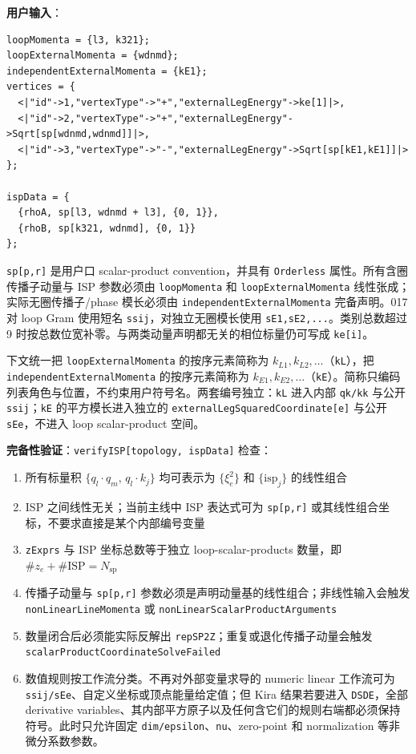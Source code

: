 ﻿\documentclass[a4paper,11pt]{article}
\begin{document}
\textbf{用户输入}：
\begin{verbatim}
loopMomenta = {l3, k321};
loopExternalMomenta = {wdnmd};
independentExternalMomenta = {kE1};
vertices = {
  <|"id"->1,"vertexType"->"+","externalLegEnergy"->ke[1]|>,
  <|"id"->2,"vertexType"->"+","externalLegEnergy"->Sqrt[sp[wdnmd,wdnmd]]|>,
  <|"id"->3,"vertexType"->"-","externalLegEnergy"->Sqrt[sp[kE1,kE1]]|>
};

ispData = {
  {rhoA, sp[l3, wdnmd + l3], {0, 1}},
  {rhoB, sp[k321, wdnmd], {0, 1}}
};
\end{verbatim}

\texttt{sp[p,r]} 是用户口 scalar-product convention，并具有 \texttt{Orderless} 属性。所有含圈传播子动量与 ISP 参数必须由 \texttt{loopMomenta} 和 \texttt{loopExternalMomenta} 线性张成；实际无圈传播子/phase 模长必须由 \texttt{independentExternalMomenta} 完备声明。017 对 loop Gram 使用短名 \texttt{ssij}，对独立无圈模长使用 \texttt{sE1,sE2,...}。类别总数超过 9 时按总数位宽补零。与两类动量声明都无关的相位标量仍可写成 \texttt{ke[i]}。

下文统一把 \texttt{loopExternalMomenta} 的按序元素简称为 $k_{L1},k_{L2},\ldots$（\texttt{kL}），把 \texttt{independentExternalMomenta} 的按序元素简称为 $k_{E1},k_{E2},\ldots$（\texttt{kE}）。简称只编码列表角色与位置，不约束用户符号名。两套编号独立：\texttt{kL} 进入内部 \texttt{qk/kk} 与公开 \texttt{ssij}；\texttt{kE} 的平方模长进入独立的 \texttt{externalLegSquaredCoordinate[e]} 与公开 \texttt{sEe}，不进入 loop scalar-product 空间。

\textbf{完备性验证}：\texttt{verifyISP[topology, ispData]} 检查：
\begin{enumerate}
  \item 所有标量积 $\{q_l \cdot q_m,\, q_l \cdot k_j\}$ 均可表示为 $\{\xi_e^2\}$ 和 $\{\text{isp}_j\}$ 的线性组合
  \item ISP 之间线性无关；当前主线中 ISP 表达式可为 \texttt{sp[p,r]} 或其线性组合坐标，不要求直接是某个内部编号变量
  \item \texttt{zExprs} 与 ISP 坐标总数等于独立 loop-scalar-products 数量，即 $\# z_e+\#\text{ISP}=N_{\text{sp}}$
  \item 传播子动量与 \texttt{sp[p,r]} 参数必须是声明动量基的线性组合；非线性输入会触发 \texttt{nonLinearLineMomenta} 或 \texttt{nonLinearScalarProductArguments}
  \item 数量闭合后必须能实际反解出 \texttt{repSP2Z}；重复或退化传播子动量会触发 \texttt{scalarProductCoordinateSolveFailed}
  \item 数值规则按工作流分类。不再对外部变量求导的 numeric linear 工作流可为 \texttt{ssij/sEe}、自定义坐标或顶点能量给定值；但 Kira 结果若要进入 \texttt{DSDE}，全部 derivative variables、其内部平方原子以及任何含它们的规则右端都必须保持符号。此时只允许固定 \texttt{dim/epsilon}、\texttt{nu}、zero-point 和 normalization 等非微分系数参数。
\end{enumerate}
\end{document}
